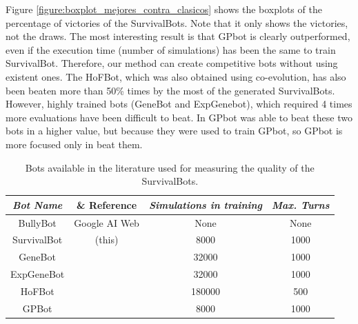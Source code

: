 \documentclass[conference]{IEEEtran}
\begin{document}
Figure \ref{figure:boxplot_mejores_contra_clasicos} shows the boxplots of the percentage of victories of the SurvivalBots. Note that it only shows the victories, not the draws. The most interesting result is that GPbot is clearly outperformed, even if the execution time (number of simulations) has been the same to train SurvivalBot. Therefore, our method can create competitive bots without using existent ones. The HoFBot, which was also obtained using co-evolution, has also been beaten more than 50\% times by the most of the generated SurvivalBots. However, highly trained bots (GeneBot and ExpGenebot), which required 4 times more evaluations have been difficult to beat. In \cite{GarciaGP14} GPbot was able to beat these two bots in a higher value, but because they were used to train GPbot, so GPbot is more focused only in beat them.

\begin{table}
\begin{center}
\begin{tabular}{|c|c|c|c|}
\hline
{\em Bot Name} & {\& Reference} & {\em Simulations in training} & {\em Max. Turns} \\\hline \hline
BullyBot & Google AI Web & None & None \\ \hline
SurvivalBot & (this) & 8000 & 1000 \\ \hline
GeneBot & \cite{Genebot_JCST} & 32000 & 1000 \\ \hline
ExpGeneBot & \cite{Genebot_CIG2012} & 32000 & 1000 \\ \hline
HoFBot & \cite{NogueiraCoevolutionary14} & 180000 & 500 \\ \hline
GPBot & \cite{GarciaGP14} & 8000 & 1000 \\ \hline


\end{tabular}
\caption{Bots available in the literature used for measuring the quality of the SurvivalBots.}     %
\label{tab:literaturebots}
\end{center}
\end{table}
\end{document}
